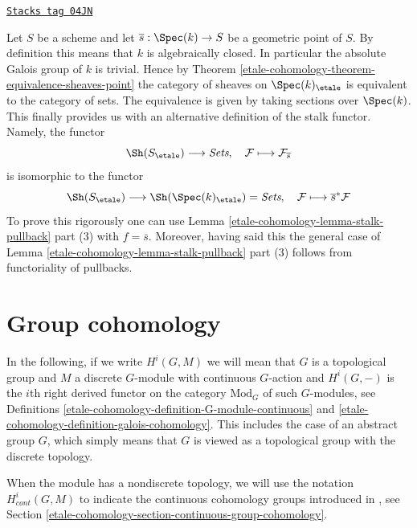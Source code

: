 \begin{remark}
\label{etale-cohomology-remark-stalk-pullback}
\href{https://stacks.math.columbia.edu/tag/04JN}{\texttt{Stacks tag 04JN}}

Let $S$ be a scheme and let $\overline{s} : \Spec(k) \to S$
be a geometric point of $S$. By definition this means that $k$
is algebraically closed. In particular the absolute Galois group of $k$
is trivial. Hence by
Theorem \ref{etale-cohomology-theorem-equivalence-sheaves-point}
the category of sheaves on $\Spec(k)_\etale$ is equivalent
to the category of sets. The equivalence is given by taking
sections over $\Spec(k)$. This finally provides us with an
alternative definition of the stalk functor. Namely, the functor
$$
\Sh(S_\etale) \longrightarrow \textit{Sets}, \quad
\mathcal{F} \longmapsto \mathcal{F}_{\overline{s}}
$$
is isomorphic to the functor
$$
\Sh(S_\etale)
\longrightarrow
\Sh(\Spec(k)_\etale) = \textit{Sets},
\quad
\mathcal{F} \longmapsto \overline{s}^*\mathcal{F}
$$
To prove this rigorously one can use
Lemma \ref{etale-cohomology-lemma-stalk-pullback} part (3)
with $f = \overline{s}$. Moreover, having said this the general case of
Lemma \ref{etale-cohomology-lemma-stalk-pullback} part (3)
follows from functoriality of pullbacks.
\end{remark}

\section{Group cohomology}
\label{etale-cohomology-section-group-cohomology}
In the following, if we write $H^i(G, M)$ we will mean that $G$
is a topological group and $M$ a discrete $G$-module with
continuous $G$-action and $H^i(G, -)$ is the $i$th right derived
functor on the category $\text{Mod}_G$ of such $G$-modules, see
Definitions \ref{etale-cohomology-definition-G-module-continuous} and
\ref{etale-cohomology-definition-galois-cohomology}. This includes
the case of an abstract group $G$, which simply means that $G$ is viewed
as a topological group with the discrete topology.

\medskip\noindent
When the module has a nondiscrete topology, we will use the notation
$H^i_{cont}(G, M)$ to indicate the continuous cohomology groups
introduced in \cite{Tate}, see
Section \ref{etale-cohomology-section-continuous-group-cohomology}.

